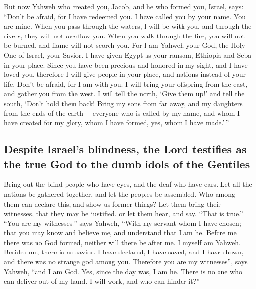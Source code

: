  But now Yahweh who created you, Jacob, and he who formed
you, Israel, says: ``Don't be afraid, for I have redeemed you. I have
called you by your name. You are mine.  When you pass
through the waters, I will be with you, and through the rivers, they
will not overflow you. When you walk through the fire, you will not be
burned, and flame will not scorch you.  For I am Yahweh
your God, the Holy One of Israel, your Savior. I have given Egypt as
your ransom, Ethiopia and Seba in your place.  Since you
have been precious and honored in my sight, and I have loved you,
therefore I will give people in your place, and nations instead of your
life.  Don't be afraid, for I am with you. I will bring
your offspring from the east, and gather you from the west.
 I will tell the north, `Give them up!' and tell the
south, `Don't hold them back! Bring my sons from far away, and my
daughters from the ends of the earth---  everyone who is
called by my name, and whom I have created for my glory, whom I have
formed, yes, whom I have made.'\,''

\hypertarget{despite-israels-blindness-the-lord-testifies-as-the-true-god-to-the-dumb-idols-of-the-gentiles}{%
\subsection{Despite Israel's blindness, the Lord testifies as the true
God to the dumb idols of the
Gentiles}\label{despite-israels-blindness-the-lord-testifies-as-the-true-god-to-the-dumb-idols-of-the-gentiles}}

 Bring out the blind people who have eyes, and the deaf
who have ears.  Let all the nations be gathered together,
and let the peoples be assembled. Who among them can declare this, and
show us former things? Let them bring their witnesses, that they may be
justified, or let them hear, and say, ``That is true.'' 
``You are my witnesses,'' says Yahweh, ``With my servant whom I have
chosen; that you may know and believe me, and understand that I am he.
Before me there was no God formed, neither will there be after me.
 I myself am Yahweh. Besides me, there is no savior.
 I have declared, I have saved, and I have shown, and
there was no strange god among you. Therefore you are my witnesses'',
says Yahweh, ``and I am God.  Yes, since the day was, I
am he. There is no one who can deliver out of my hand. I will work, and
who can hinder it?''

